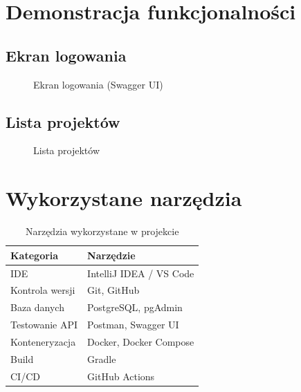 \documentclass[12pt,a4paper]{report}
\begin{document}
\section{Demonstracja funkcjonalności}

\subsection{Ekran logowania}

\begin{figure}[H]
\centering
{}
\caption{Ekran logowania (Swagger UI)}
\end{figure}

\subsection{Lista projektów}

\begin{figure}[H]
\centering
{}
\caption{Lista projektów}
\end{figure}

\section{Wykorzystane narzędzia}

\begin{table}[H]
\centering
\caption{Narzędzia wykorzystane w projekcie}
\begin{tabular}{|l|l|}
\hline
\textbf{Kategoria} & \textbf{Narzędzie} \\
\hline
IDE & IntelliJ IDEA / VS Code \\
Kontrola wersji & Git, GitHub \\
Baza danych & PostgreSQL, pgAdmin \\
Testowanie API & Postman, Swagger UI \\
Konteneryzacja & Docker, Docker Compose \\
Build & Gradle \\
CI/CD & GitHub Actions \\
\hline
\end{tabular}
\end{table}
\end{document}
